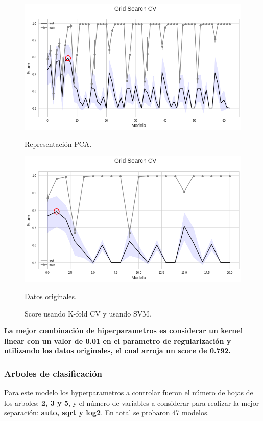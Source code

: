 \documentclass[paper=letter, fontsize=11pt]{scrartcl}
\numberwithin{equation}{section} %
\numberwithin{figure}{section} %
\numberwithin{table}{section} %
\begin{document}
\begin{figure}[!htb]
  \includegraphics[width=\linewidth]{figure/s_smv_pca.png}
  \caption{Representación PCA.}\label{act}
\endminipage\hfill
{}
  \includegraphics[width=\linewidth]{figure/s_smv.png}\caption{Datos originales.}\label{arqui}
\endminipage
\caption{Score usando K-fold CV y usando SVM.}\label{s_smv}
\end{figure}

\textbf{La mejor combinación de hiperparametros es considerar un kernel linear con un valor de 0.01 en el parametro de regularización y utilizando los datos originales, el cual arroja un score de 0.792.} 


\subsubsection*{Arboles de clasificación}
Para este modelo los hyperparametros a controlar fueron el número de hojas de los arboles: \textbf{2, 3 y 5},  y el número de variables a considerar para realizar la mejor separación: \textbf{auto, sqrt y log2}. En total se probaron 47 modelos.\\
\end{document}
